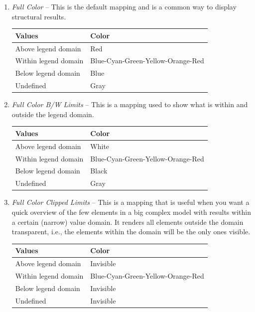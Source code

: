 \begin{enumerate}
  \setlength\itemsep{3mm}

\item{\sl Full Color} --
  This is the default mapping and is a common way to display structural results.

  \begin{tabular}{ | m{4.0cm} | m{6cm} | }
    \hline
    Values               & Color \\
    \hline\hline
    Above legend domain  & Red \\
    \hline
    Within legend domain & Blue-Cyan-Green-Yellow-Orange-Red \\
    \hline
    Below legend domain  & Blue \\
    \hline
    Undefined            & Gray \\
    \hline
\end{tabular}

\item{\sl Full Color B/W Limits} --
  This is a mapping used to show what is within and outside the legend domain.

  \begin{tabular}{ | m{4.0cm} | m{6cm} | }
    \hline
    Values               & Color \\
    \hline\hline
    Above legend domain  & White \\
    \hline
    Within legend domain & Blue-Cyan-Green-Yellow-Orange-Red \\
    \hline
    Below legend domain  & Black \\
    \hline
    Undefined            & Gray \\
    \hline
  \end{tabular}

\item{\sl Full Color Clipped Limits} --
  This is a mapping that is useful when you want a quick overview of the few
  elements in a big complex model with results within a certain (narrow) value
  domain. It renders all elements outside the domain transparent, i.e.,
  the elements within the domain will be the only ones visible.

  \begin{tabular}{ | m{4.0cm} | m{6cm} | }
    \hline
    Values               & Color \\
    \hline\hline
    Above legend domain  & Invisible \\
    \hline
    Within legend domain & Blue-Cyan-Green-Yellow-Orange-Red \\
    \hline
    Below legend domain  & Invisible \\
    \hline
    Undefined            & Invisible \\
    \hline
  \end{tabular}


\end{enumerate}
